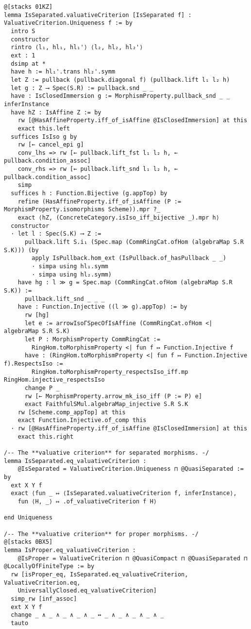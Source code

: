 \documentclass{article}
\begin{document}
\begin{lstlisting}[language=Lean, caption={ValuativeCriterion.lean}]
@[stacks 01KZ]
lemma IsSeparated.valuativeCriterion [IsSeparated f] : ValuativeCriterion.Uniqueness f := by
  intro S
  constructor
  rintro ⟨l₁, hl₁, hl₁'⟩ ⟨l₂, hl₂, hl₂'⟩
  ext : 1
  dsimp at *
  have h := hl₁'.trans hl₂'.symm
  let Z := pullback (pullback.diagonal f) (pullback.lift l₁ l₂ h)
  let g : Z ⟶ Spec(S.R) := pullback.snd _ _
  have : IsClosedImmersion g := MorphismProperty.pullback_snd _ _ inferInstance
  have hZ : IsAffine Z := by
    rw [@HasAffineProperty.iff_of_isAffine @IsClosedImmersion] at this
    exact this.left
  suffices IsIso g by
    rw [← cancel_epi g]
    conv_lhs => rw [← pullback.lift_fst l₁ l₂ h, ← pullback.condition_assoc]
    conv_rhs => rw [← pullback.lift_snd l₁ l₂ h, ← pullback.condition_assoc]
    simp
  suffices h : Function.Bijective (g.appTop) by
    refine (HasAffineProperty.iff_of_isAffine (P := MorphismProperty.isomorphisms Scheme)).mpr ?_
    exact ⟨hZ, (ConcreteCategory.isIso_iff_bijective _).mpr h⟩
  constructor
  · let l : Spec(S.K) ⟶ Z :=
      pullback.lift S.i₁ (Spec.map (CommRingCat.ofHom (algebraMap S.R S.K))) (by
        apply IsPullback.hom_ext (IsPullback.of_hasPullback _ _)
        · simpa using hl₁.symm
        · simpa using hl₂.symm)
    have hg : l ≫ g = Spec.map (CommRingCat.ofHom (algebraMap S.R S.K)) :=
      pullback.lift_snd _ _ _
    have : Function.Injective ((l ≫ g).appTop) := by
      rw [hg]
      let e := arrowIsoΓSpecOfIsAffine (CommRingCat.ofHom <| algebraMap S.R S.K)
      let P : MorphismProperty CommRingCat :=
        RingHom.toMorphismProperty <| fun f ↦ Function.Injective f
      have : (RingHom.toMorphismProperty <| fun f ↦ Function.Injective f).RespectsIso :=
        RingHom.toMorphismProperty_respectsIso_iff.mp RingHom.injective_respectsIso
      change P _
      rw [← MorphismProperty.arrow_mk_iso_iff (P := P) e]
      exact FaithfulSMul.algebraMap_injective S.R S.K
    rw [Scheme.comp_appTop] at this
    exact Function.Injective.of_comp this
  · rw [@HasAffineProperty.iff_of_isAffine @IsClosedImmersion] at this
    exact this.right

/-- The **valuative criterion** for separated morphisms. -/
lemma IsSeparated.eq_valuativeCriterion :
    @IsSeparated = ValuativeCriterion.Uniqueness ⊓ @QuasiSeparated := by
  ext X Y f
  exact ⟨fun _ ↦ ⟨IsSeparated.valuativeCriterion f, inferInstance⟩,
    fun ⟨H, _⟩ ↦ .of_valuativeCriterion f H⟩

end Uniqueness

/-- The **valuative criterion** for proper morphisms. -/
@[stacks 0BX5]
lemma IsProper.eq_valuativeCriterion :
    @IsProper = ValuativeCriterion ⊓ @QuasiCompact ⊓ @QuasiSeparated ⊓ @LocallyOfFiniteType := by
  rw [isProper_eq, IsSeparated.eq_valuativeCriterion, ValuativeCriterion.eq,
    UniversallyClosed.eq_valuativeCriterion]
  simp_rw [inf_assoc]
  ext X Y f
  change _ ∧ _ ∧ _ ∧ _ ∧ _ ↔ _ ∧ _ ∧ _ ∧ _ ∧ _
  tauto


\end{lstlisting}
\end{document}
